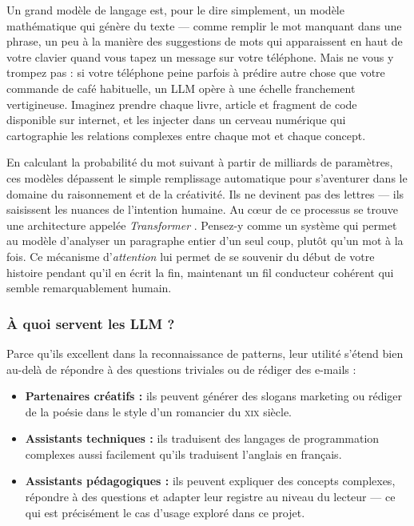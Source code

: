 \documentclass[a4paper,11pt]{article}
\begin{document}
Un grand modèle de langage est, pour le dire simplement, un modèle
mathématique qui génère du texte --- comme remplir le mot manquant dans
une phrase, un peu à la manière des \og suggestions de mots \fg{} qui
apparaissent en haut de votre clavier quand vous tapez un message sur votre
téléphone. Mais ne vous y trompez pas : si votre téléphone peine parfois
à prédire autre chose que votre commande de café habituelle, un LLM opère
à une échelle franchement vertigineuse. Imaginez prendre chaque livre,
article et fragment de code disponible sur internet, et les injecter dans
un cerveau numérique qui cartographie les relations complexes entre chaque
mot et chaque concept. \cite{llm_scale_placeholder}

En calculant la probabilité du mot suivant à partir de milliards de
paramètres, ces modèles dépassent le simple \og remplissage automatique \fg{}
pour s'aventurer dans le domaine du raisonnement et de la créativité. Ils ne
devinent pas des lettres --- ils saisissent les nuances de l'intention
humaine. Au c\oe{}ur de ce processus se trouve une architecture appelée
\emph{Transformer} \cite{vaswani2017attention}. Pensez-y comme un système
qui permet au modèle d'analyser un paragraphe entier d'un seul coup, plutôt
qu'un mot à la fois. Ce mécanisme d'\emph{attention} lui permet de se
souvenir du début de votre histoire pendant qu'il en écrit la fin, maintenant
un fil conducteur cohérent qui semble remarquablement humain.

\subsubsection{À quoi servent les LLM ?}

Parce qu'ils excellent dans la reconnaissance de patterns, leur utilité
s'étend bien au-delà de répondre à des questions triviales ou de rédiger
des e-mails :

\begin{itemize}
  \item \textbf{Partenaires créatifs :} ils peuvent générer des slogans
    marketing ou rédiger de la poésie dans le style d'un romancier du
    \textsc{xix}\ieme{} siècle.
  \item \textbf{Assistants techniques :} ils traduisent des langages de
    programmation complexes aussi facilement qu'ils traduisent l'anglais
    en français.
  \item \textbf{Assistants pédagogiques :} ils peuvent expliquer des
    concepts complexes, répondre à des questions et adapter leur registre
    au niveau du lecteur --- ce qui est précisément le cas d'usage exploré
    dans ce projet.
\end{itemize}
\end{document}
